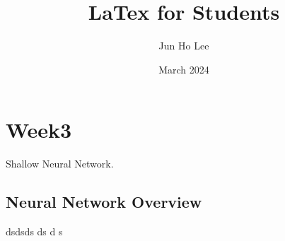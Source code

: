 \documentclass{article}
\title{LaTex for Students}
\author{Jun Ho Lee}
\date{March 2024}
\begin{document}
\newpage
\section{Week3}

Shallow Neural Network.

\newpage
\subsection{Neural Network Overview}

dsdsds
ds
d
s

\newpage
\subsection{}
\end{document}
